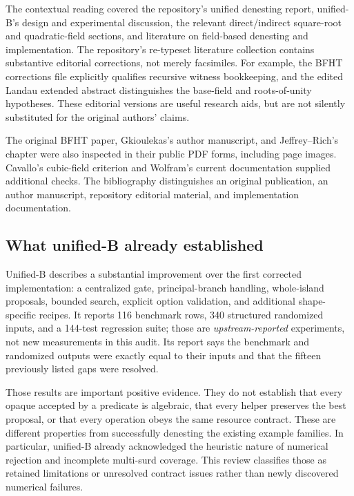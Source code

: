 \documentclass[11pt,a4paper]{article}
\newcommand{\code}[1]{\texttt{\detokenize{#1}}}
\theoremstyle{remark}\newtheorem{remark}[theorem]{Remark}
\begin{document}
The contextual reading covered the repository's unified denesting report, unified-B's design and experimental discussion, the relevant direct/indirect square-root and quadratic-field sections, and literature on field-based denesting and implementation. The repository's re-typeset literature collection contains substantive editorial corrections, not merely facsimiles. For example, the BFHT corrections file explicitly qualifies recursive witness bookkeeping, and the edited Landau extended abstract distinguishes the base-field and roots-of-unity hypotheses. These editorial versions are useful research aids, but are not silently substituted for the original authors' claims.\cite{report,reviewB,retypeset,bfhtcorrections,landauedited}

The original BFHT paper, Gkioulekas's author manuscript, and Jeffrey--Rich's chapter were also inspected in their public PDF forms, including page images. Cavallo's cubic-field criterion and Wolfram's current documentation supplied additional checks. The bibliography distinguishes an original publication, an author manuscript, repository editorial material, and implementation documentation.\cite{bfht,gkioulekas,jeffrey,cavallo,rootdoc}

\subsection{What unified-B already established}
Unified-B describes a substantial improvement over the first corrected implementation: a centralized gate, principal-branch handling, whole-island proposals, bounded search, explicit option validation, and additional shape-specific recipes. It reports 116 benchmark rows, 340 structured randomized inputs, and a 144-test regression suite; those are \emph{upstream-reported} experiments, not new measurements in this audit. Its report says the benchmark and randomized outputs were exactly equal to their inputs and that the fifteen previously listed gaps were resolved.\cite{reviewB}

Those results are important positive evidence. They do not establish that every opaque \code{Root} accepted by a predicate is algebraic, that every helper preserves the best proposal, or that every operation obeys the same resource contract. These are different properties from successfully denesting the existing example families. In particular, unified-B already acknowledged the heuristic nature of numerical rejection and incomplete multi-surd coverage. This review classifies those as retained limitations or unresolved contract issues rather than newly discovered numerical failures.
\end{document}
